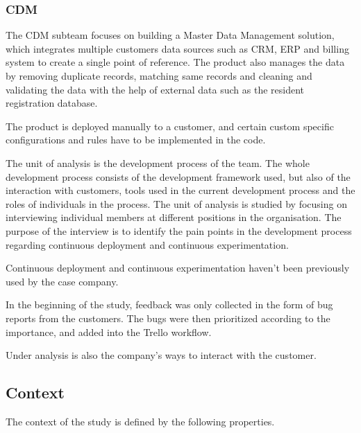 \documentclass[english]{tktltiki2}
\theoremstyle{definition}
\theoremstyle{remark}
\begin{document}
\subsubsection{CDM} 
The CDM subteam focuses on building a Master Data Management \cite{loshin2010master} solution, which integrates multiple customers data sources such as CRM, ERP and billing system to create a single point of reference. The product also manages the data by removing duplicate records, matching same records and cleaning and validating the data with the help of external data such as the resident registration database. 

The product is deployed manually to a customer, and certain custom specific configurations and rules have to be implemented in the code. 




The unit of analysis is the development process of the team. The whole development process consists of the development framework used, but also of the interaction with customers, tools used in the current development process and the roles of individuals in the process. The unit of analysis is studied by focusing on interviewing individual members at different positions in the organisation. The purpose of the interview is to identify the pain points in the development process regarding continuous deployment and continuous experimentation. 

Continuous deployment and continuous experimentation haven't been previously used by the case company. 

In the beginning of the study, feedback was only collected in the form of bug reports from the customers. The bugs were then prioritized according to the importance, and added into the Trello workflow. 

Under analysis is also the company's ways to interact with the customer.

\subsection{Context} %

The context of the study is defined by the following properties.
\end{document}

